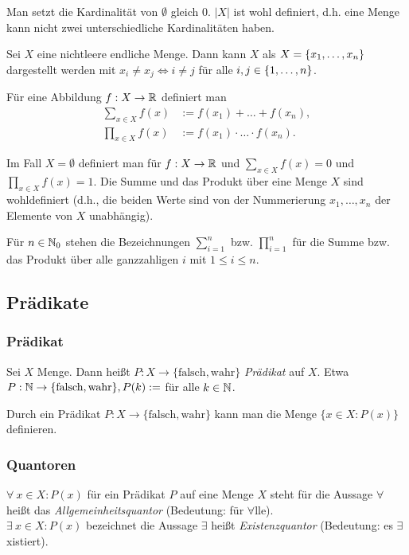Man setzt die Kardinalität von $ \emptyset $ gleich $0$. $ |X| $ ist wohl definiert, d.h. eine Menge kann nicht zwei unterschiedliche Kardinalitäten haben.

Sei $ X $ eine nichtleere endliche Menge. Dann kann $ X $ als $ X = \{ x_1,\ldots,x_n \} $ dargestellt werden mit  $ x_i \neq x_j \Leftrightarrow i \neq j $ für alle $ i,j \in \{ 1,\ldots,n \} $.

Für eine Abbildung $ f : X \to \mathbb R $ definiert man
\begin{align*}
	\sum\limits_{x \in X} f(x) &:= f(x_1) + \ldots + f(x_n),
\\
	\prod\limits_{x \in X} f(x) &:= f(x_1) \cdot \ldots \cdot f(x_n).
\end{align*}

Im Fall $ X = \emptyset $ definiert man für $ f : X \to \mathbb R $ und $ \sum\limits_{x \in X} f(x) = 0 $ und $ \prod\limits_{x \in X} f(x) = 1 $. Die Summe und das Produkt über eine Menge $X$ sind wohldefiniert (d.h., die beiden Werte sind von der Nummerierung $x_1,\ldots,x_n$ der Elemente von $X$ unabhängig).

Für $n \in \mathbb N_0$ stehen die Bezeichnungen $\sum_{i=1}^n$ bzw. $\prod_{i=1}^n$ für die Summe bzw. das Produkt über alle ganzzahligen $i$ mit $1 \le i \le n$. 



\subsection{Prädikate}

\subsubsection{Prädikat}

Sei $ X $ Menge. Dann heißt $ P : X \to \{ \text{falsch},\text{wahr} \} $ \emph{Prädikat} auf $ X $. Etwa $ P : \mathbb N \to \{ \text{falsch},\text{wahr} \}, P(k) := $  für alle $ k \in \mathbb N $.

Durch ein Prädikat $ P : X \to \{ \text{falsch},\text{wahr} \} $ kann man die Menge $ \{ x \in X : P(x) \} $ definieren.

\subsubsection{Quantoren}

$ \forall\: x \in X : P(x) $ für ein Prädikat $ P $ auf eine Menge $ X $ steht für die Aussage  $ \forall $ heißt das \emph{Allgemeinheitsquantor} (Bedeutung: für $ \forall $lle). \\[10pt]
%
$ \exists\: x \in X : P(x) $ bezeichnet die Aussage  $ \exists $ heißt \emph{Existenzquantor} (Bedeutung: es $ \exists $xistiert).

